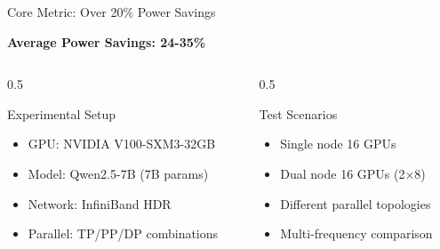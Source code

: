 \documentclass[aspectratio=169,10pt]{beamer}
\begin{document}
\begin{frame}{Core Metric: Over 20\% Power Savings}
\begin{center}
\huge \textbf{Average Power Savings: \textcolor{successgreen}{24-35\%}}
\end{center}
\vspace{0.5cm}
\begin{columns}
\begin{column}{0.5\textwidth}
\begin{block}{Experimental Setup}
\begin{itemize}
    \item GPU: NVIDIA V100-SXM3-32GB
    \item Model: Qwen2.5-7B (7B params)
    \item Network: InfiniBand HDR
    \item Parallel: TP/PP/DP combinations
\end{itemize}
\end{block}
\end{column}
\begin{column}{0.5\textwidth}
\begin{block}{Test Scenarios}
\begin{itemize}
    \item Single node 16 GPUs
    \item Dual node 16 GPUs (2×8)
    \item Different parallel topologies
    \item Multi-frequency comparison
\end{itemize}
\end{block}
\end{column}
\end{columns}
\end{frame}
\end{document}
